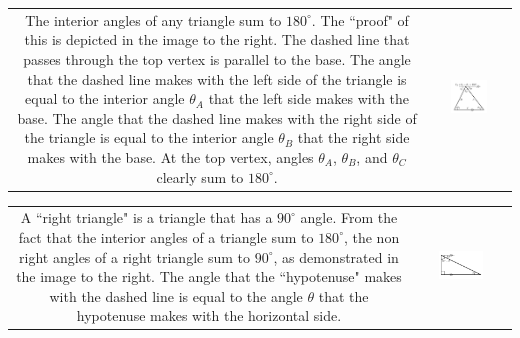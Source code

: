 \documentclass{article}
\begin{document}
\begin{tabular}{cc}
\parbox{0.4\textwidth}{
The interior angles of any triangle sum to \(180^\circ\). The ``proof" of this is depicted in the image to the right. The dashed line that passes through the top vertex is parallel to the base. The angle that the dashed line makes with the left side of the triangle is equal to the interior angle \(\theta_A\) that the left side makes with the base. The angle that the dashed line makes with the right side of the triangle is equal to the interior angle \(\theta_B\) that the right side makes with the base. At the top vertex, angles \(\theta_A\), \(\theta_B\), and \(\theta_C\) clearly sum to \(180^\circ\).
} & 
\parbox{0.5\textwidth}{\includegraphics[width = 0.5\textwidth]{triangle_angles_sum_to_180}}
\end{tabular}

\begin{tabular}{cc}
\parbox{0.4\textwidth}{
A ``right triangle" is a triangle that has a \(90^\circ\) angle. From the fact that the interior angles of a triangle sum to \(180^\circ\), the non right angles of a right triangle sum to \(90^\circ\), as demonstrated in the image to the right. The angle that the ``hypotenuse" makes with the dashed line is equal to the angle \(\theta\) that the hypotenuse makes with the horizontal side.
} & 
\parbox{0.5\textwidth}{\includegraphics[width = 0.5\textwidth]{right_triangle_angles_sum_to_90}}
\end{tabular}
\end{document}
